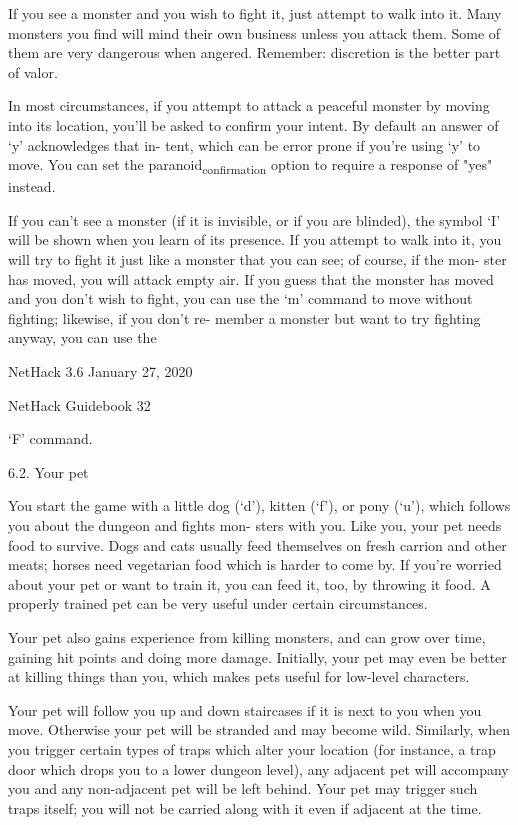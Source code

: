 \documentclass[11pt]{article}
\begin{document}
   If you see a monster and you wish to fight it, just attempt
to walk into it.  Many monsters you find will mind their own
business unless you attack them. Some of them are very dangerous
when angered. Remember: discretion is the better part of valor.

   In most circumstances, if you attempt to attack a peaceful
monster by moving into its location, you'll be asked to confirm
your intent.  By default an answer of `y' acknowledges that in-
tent, which can be error prone if you're using `y' to move.  You
can set the paranoid\textsubscript{confirmation} option to require a response of
"yes" instead.

   If you can't see a monster (if it is invisible, or if you
are blinded), the symbol `I' will be shown when you learn of its
presence. If you attempt to walk into it, you will try to fight
it just like a monster that you can see; of course, if the mon-
ster has moved, you will attack empty air. If you guess that the
monster has moved and you don't wish to fight, you can use the
`m' command to move without fighting; likewise, if you don't re-
member a monster but want to try fighting anyway, you can use the


NetHack 3.6                   January 27, 2020





NetHack Guidebook                       32



`F' command.

6.2. Your pet

   You start the game with a little dog (`d'), kitten (`f'), or
pony (`u'), which follows you about the dungeon and fights mon-
sters with you. Like you, your pet needs food to survive.  Dogs
and cats usually feed themselves on fresh carrion and other
meats; horses need vegetarian food which is harder to come by.
If you're worried about your pet or want to train it, you can
feed it, too, by throwing it food. A properly trained pet can be
very useful under certain circumstances.

   Your pet also gains experience from killing monsters, and
can grow over time, gaining hit points and doing more damage.
Initially, your pet may even be better at killing things than
you, which makes pets useful for low-level characters.

   Your pet will follow you up and down staircases if it is
next to you when you move. Otherwise your pet will be stranded
and may become wild. Similarly, when you trigger certain types
of traps which alter your location (for instance, a trap door
which drops you to a lower dungeon level), any adjacent pet will
accompany you and any non-adjacent pet will be left behind. Your
pet may trigger such traps itself; you will not be carried along
with it even if adjacent at the time.
\end{document}
